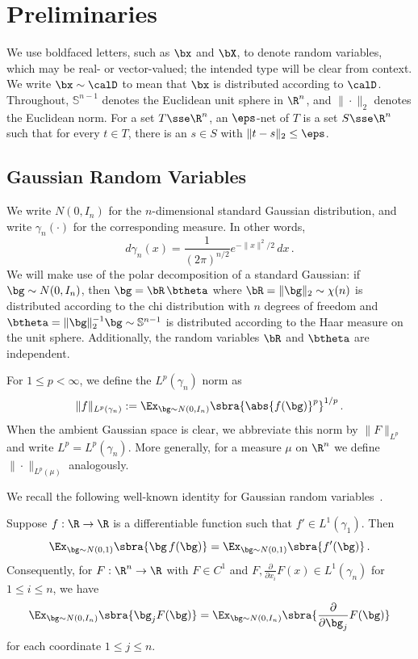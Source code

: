 \documentclass[11pt]{article}
\renewcommand{\S}{\mathbb{S}}
\begin{document}
\section{Preliminaries}
\label{sec:prelims} 

We use boldfaced letters, such as $\bx$ and $\bX$, to denote random variables, which may be real- or vector-valued; the intended type will be clear from context.  
We write $\bx \sim \calD$ to mean that $\bx$ is distributed according to $\calD$. 
Throughout, $\S^{n-1}$ denotes the Euclidean unit sphere in $\R^n$, and $\|\cdot\|_2$ denotes the Euclidean norm. 
For a set $T \sse \R^n$, an $\eps$-net of $T$ is a set $S \sse \R^n$ such that for every $t \in T$, there is an $s \in S$ with $\|t-s\|_2 \leq \eps$. 

\subsection{Gaussian Random Variables}
\label{subsec:prelims-gaussian-rvs}

We write $N(0, I_n)$ for the $n$-dimensional standard Gaussian distribution, and write $\gamma_n(\cdot)$ for the corresponding measure. 
In other words, 
\[
	d\gamma_n(x) = \frac{1}{(2\pi)^{n/2}} e^{-\|x\|^2/2}\,dx\,. 
\] 
We will make use of the polar decomposition of a standard Gaussian: if $\bg\sim N(0, I_n)$, then $\bg = \bR \, \btheta$ where $\bR = \|\bg\|_2 \sim \chi(n)$ is distributed according to the chi distribution with $n$ degrees of freedom and $\btheta = \|\bg\|_2^{-1} \bg \sim \S^{n-1}$ is distributed according to the Haar measure on the unit sphere. 
Additionally, the random variables $\bR$ and $\btheta$ are independent.  

For $1 \leq p < \infty$, we define the $L^p(\gamma_n)$ norm as  
\[
	\|f\|_{L^p(\gamma_n)} := \Ex_{\bg\sim N(0,I_n)}\sbra{\abs{f(\bg)}^p}^{1/p}\,.
\]
When the ambient Gaussian space is clear, we abbreviate this norm by $\|F\|_{L^p}$ and write $L^p=L^p(\gamma_n)$. 
More generally, for a measure $\mu$ on $\R^n$ we define $\|\cdot\|_{L^p(\mu)}$ analogously. 

We recall the following well-known identity for Gaussian random variables~\cite[Appendix~A.3]{chatterjee2014superconcentration}. 

\begin{lemma} \label{lemma:gaussian-IBP}
	Suppose $f: \R \to \R$ is a differentiable function such that $f'\in L^1(\gamma_1) $. 
	Then 
	\[
		\Ex_{\bg\sim N(0,1)}\sbra{\bg\, f(\bg)} = \Ex_{\bg\sim N(0,1)}\sbra{f'(\bg)}\,.
	\]
	Consequently, for $F : \R^n \to \R$ with $F \in C^1$ and $F, \frac{\partial}{\partial x_i} F(x) \in L^1(\gamma_n)$ for $1 \leq i \leq n$, we have   
	\[
		\Ex_{\bg\sim N(0, I_n)}\sbra{\bg_j F(\bg)}
		=
		\Ex_{\bg\sim N(0, I_n)}\sbra{\frac{\partial}{\partial \bg_j} F(\bg)}
	\]
	for each coordinate $1 \leq j \leq n$. 
\end{lemma}
\end{document}
